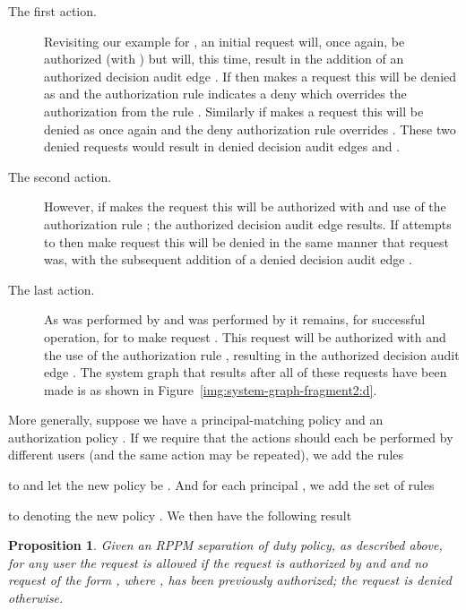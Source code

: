 \documentclass{article}
\newtheorem{proposition}{Proposition}
\begin{document}
\begin{description}
    \item[The first action.]
    Revisiting our example for , an initial request  will, once again, be authorized (with ) but will, this time, result in the addition of an authorized decision audit edge . If  then makes a request  this will be denied as  and the authorization rule  indicates a deny which overrides the authorization from the rule .
    Similarly if  makes a request  this will be denied as once again  and the deny authorization rule  overrides .
    These two denied requests would result in denied decision audit edges  and . 
    \item[The second action.]
    However, if  makes the request  this will be authorized with  and use of the authorization rule ; the authorized decision audit edge  results.
    If  attempts to then make request  this will be denied in the same manner that request  was, with the subsequent addition of a denied decision audit edge .

    \item[The last action.]
    As  was performed by  and  was performed by  it remains, for successful operation, for  to make request .
    This request will be authorized with  and the use of the authorization rule , resulting in the authorized decision audit edge .
    The system graph that results after all of these requests have been made is as shown in Figure~\ref{img:system-graph-fragment2:d}.
\end{description}

More generally, suppose we have a principal-matching policy  and an authorization policy . If we require that the actions  should each be performed by different users (and the same action may be repeated), we add the rules

to  and let the new policy be . And for each principal , we add the set of rules

to  denoting the new policy . We then have the following result

\begin{proposition}\label{prop:separation-of-duty}
    Given an RPPM separation of duty policy, as described above, for any user  the request  is allowed if the request is authorized by  and  and no request of the form , where , has been previously authorized; the request is denied otherwise.
\end{proposition}
\end{document}
